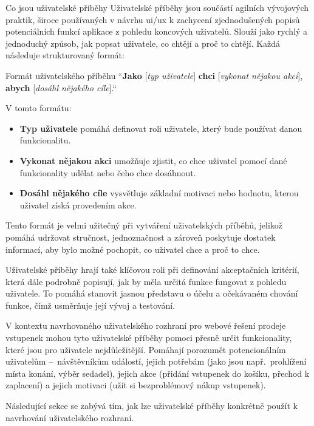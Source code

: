 \begin{subsection}{Co jsou uživatelské příběhy}
    \label{subsec:navrh-ui-uzivatelske-pribehy-co-jsou}
    Uživatelské příběhy jsou součástí agilních vývojových praktik, široce používaných v návrhu \ac{ui}/\ac{ux} k zachycení zjednodušených popisů potenciálních funkcí aplikace z pohledu koncových uživatelů.
    Slouží jako rychlý a jednoduchý způsob, jak popsat uživatele, co chtějí a proč to chtějí\cite{w_articles_user_stories_a_foundation_for_ui_design}.
    Každá  následuje strukturovaný formát:

    \begin{gray-box}{Formát uživatelského příběhu}
        ``\textbf{Jako} [\textit{typ uživatele}] \textbf{chci} [\textit{vykonat nějakou akci}], \textbf{abych} [\textit{dosáhl nějakého cíle}].``
    \end{gray-box}

    V tomto formátu:
    \begin{itemize}
        \item \textbf{Typ uživatele} pomáhá definovat roli uživatele, který bude používat danou funkcionalitu.
        \item \textbf{Vykonat nějakou akci} umožňuje zjistit, co chce uživatel pomocí dané funkcionality udělat nebo čeho chce dosáhnout.
        \item \textbf{Dosáhl nějakého cíle} vysvětluje základní motivaci nebo hodnotu, kterou uživatel získá provedením akce.
    \end{itemize}

    Tento formát je velmi užitečný při vytváření uživatelských příběhů, jelikož pomáhá udržovat stručnost, jednoznačnost a zároveň poskytuje dostatek informací, aby bylo možné pochopit, co uživatel chce a proč to chce.

    Uživatelské příběhy hrají také klíčovou roli při definování akceptačních kritérií, která dále podrobně popisují, jak by měla určitá funkce fungovat z pohledu uživatele.
    To pomáhá stanovit jasnou představu o účelu a očekávaném chování funkce, čímž usměrňuje její vývoj a testování\cite{w_articles_user_stories_a_foundation_for_ui_design}.

    V kontextu navrhovaného uživatelského rozhraní pro webové řešení prodeje vstupenek mohou tyto uživatelské příběhy pomoci přesně určit funkcionality, které jsou pro uživatele nejdůležitější.
    Pomáhají porozumět potencionálním uživatelům –~návštěvníkům událostí, jejich potřebám (jako jsou např.\ prohlížení místa konání, výběr sedadel), jejich akce (přidání vstupenek do košíku, přechod k zaplacení) a jejich motivaci (užít si bezproblémový nákup vstupenek).

    Následující sekce se zabývá tím, jak lze uživatelské příběhy konkrétně použít k navrhování uživatelského rozhraní.
\end{subsection}


